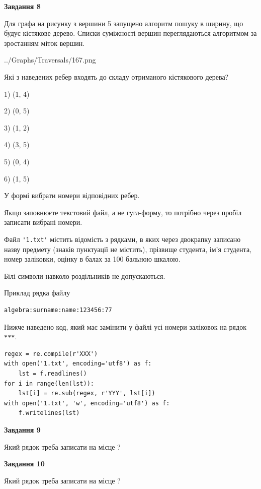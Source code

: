 \documentclass[12pt, ukrainian]{article}
\def\code#1{\Verb!#1!}
\begin{document}
{\begin {large}
{\begin {center}\textbf{Завдання 8}\end {center}}\par
Для графа на рисунку з вершини 5 запущено алгоритм пошуку в ширину, що будує кістякове дерево. Списки суміжності вершин переглядаються алгоритмом за зростанням міток вершин.\par
\begin{center}
	{../Graphs/Traversals/167.png}
\end{center}
\par Які з наведених ребер входять до складу отриманого кістякового дерева?\par
1) (1, 4)\par
2) (0, 5)\par
3) (1, 2)\par
4) (3, 5)\par
5) (0, 4)\par
6) (1, 5)\par
{\vskip 15pt} У формі вибрати номери відповідних ребер.


Якщо заповнюєте текстовий файл, а не гугл-форму, то потрібно через пробіл записа\-ти вибрані номери.\par
\newpage


Файл \code{'1.txt'} містить відомість з рядками, в яких через двокрапку записа\-но назву предмету (знаків пунктуації не містить), прізвище студента, ім'я студента, номер залі\-ков\-ки, оцінку в балах за 100 бальною шкалою.

Білі символи навколо роздільників не допускаються.

Приклад рядка файлу



\begin{verbatim}
algebra:surname:name:123456:77
\end{verbatim}


Нижче наведено код, який має замінити у файлі усі номери заліковок на рядок \code{***}.



\begin{verbatim}
regex = re.compile(r'XXX')
with open('1.txt', encoding='utf8') as f:
    lst = f.readlines()
for i in range(len(lst)):
    lst[i] = re.sub(regex, r'YYY', lst[i])
with open('1.txt', 'w', encoding='utf8') as f:
    f.writelines(lst)
\end{verbatim}




{\begin {center}\textbf{Завдання 9}\end {center}}\par
Який рядок треба записати на місце  ?\par
\vspace{5mm}


{\begin {center}\textbf{Завдання 10}\end {center}}\par
Який рядок треба записати на місце  ?\par


\newpage


\end {large}}
\end{document}
